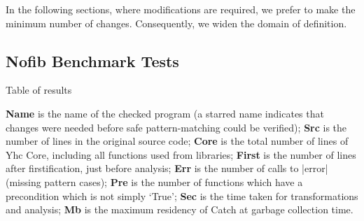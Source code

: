 \documentclass[preprint]{sigplanconf}
\begin{document}
In the following sections, where modifications are required, we prefer to make the minimum number of changes. Consequently, we widen the domain of definition.

\subsection{Nofib Benchmark Tests}
\label{sec:imaginary}

\begin{table}
\caption{Table of results}
\label{tab:results}

\smallskip

\textbf{Name} is the name of the checked program (a starred name indicates that changes were needed before safe pattern-matching could be verified);
\textbf{Src} is the number of lines in the original source code;
\textbf{Core} is the total number of lines of Yhc Core, including all functions used from libraries;
\textbf{First} is the number of lines after firstification, just before analysis;
\textbf{Err} is the number of calls to |error| (missing pattern cases);
\textbf{Pre} is the number of functions which have a precondition which is not simply `True';
\textbf{Sec} is the time taken for transformations and analysis;
\textbf{Mb} is the maximum residency of Catch at garbage collection time.

\smallskip\smallskip


\end{table}
\end{document}
